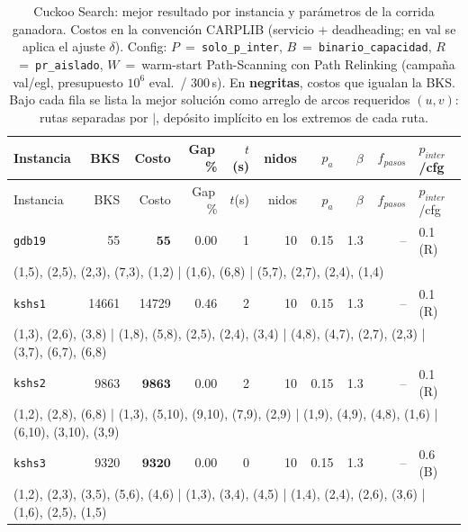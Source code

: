 \begingroup\scriptsize
\begin{longtable}{lrrrrrrrrl}
\caption{Cuckoo Search: mejor resultado por instancia y parámetros de la corrida ganadora. Costos en la convención CARPLIB (servicio + deadheading; en val se aplica el ajuste $\delta$). Config: $P$~=~\texttt{solo\_p\_inter}, $B$~=~\texttt{binario\_capacidad}, $R$~=~\texttt{pr\_aislado}, $W$~=~warm-start Path-Scanning con Path Relinking (campaña val/egl, presupuesto $10^6$ eval.\ / 300\,s). En \textbf{negritas}, costos que igualan la BKS. Bajo cada fila se lista la mejor solución como arreglo de arcos requeridos $(u,v)$: rutas separadas por $|$, depósito implícito en los extremos de cada ruta.}\label{tab:cuckoo-por-instancia}\\
\toprule
Instancia & BKS & Costo & Gap\,\% & $t$(s) & nidos & $p_a$ & $\beta$ & $f_{pasos}$ & $p_{inter}$/cfg \\
\midrule
\endfirsthead
\toprule
Instancia & BKS & Costo & Gap\,\% & $t$(s) & nidos & $p_a$ & $\beta$ & $f_{pasos}$ & $p_{inter}$/cfg \\
\midrule
\endhead
\bottomrule
\endfoot
\texttt{gdb19} & 55 & $\mathbf{55}$ & 0.00 & 1 & 10 & 0.15 & 1.3 & -- & 0.1\,(R) \\
\multicolumn{10}{p{0.96\linewidth}}{\tiny\raggedright\arraybackslash (1,5), (2,5), (2,3), (7,3), (1,2) | (1,6), (6,8) | (5,7), (2,7), (2,4), (1,4)} \\[2pt]
\texttt{kshs1} & 14661 & 14729 & 0.46 & 2 & 10 & 0.15 & 1.3 & -- & 0.1\,(R) \\
\multicolumn{10}{p{0.96\linewidth}}{\tiny\raggedright\arraybackslash (1,3), (2,6), (3,8) | (1,8), (5,8), (2,5), (2,4), (3,4) | (4,8), (4,7), (2,7), (2,3) | (3,7), (6,7), (6,8)} \\[2pt]
\texttt{kshs2} & 9863 & $\mathbf{9863}$ & 0.00 & 2 & 10 & 0.15 & 1.3 & -- & 0.1\,(R) \\
\multicolumn{10}{p{0.96\linewidth}}{\tiny\raggedright\arraybackslash (1,2), (2,8), (6,8) | (1,3), (5,10), (9,10), (7,9), (2,9) | (1,9), (4,9), (4,8), (1,6) | (6,10), (3,10), (3,9)} \\[2pt]
\texttt{kshs3} & 9320 & $\mathbf{9320}$ & 0.00 & 0 & 10 & 0.15 & 1.3 & -- & 0.6\,(B) \\
\multicolumn{10}{p{0.96\linewidth}}{\tiny\raggedright\arraybackslash (1,2), (2,3), (3,5), (5,6), (4,6) | (1,3), (3,4), (4,5) | (1,4), (2,4), (2,6), (3,6) | (1,6), (2,5), (1,5)} \\[2pt]

\end{longtable}
